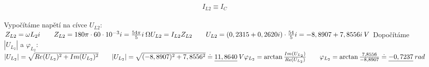 \huge{\[I_{L2} \equiv I_C\]} \\
\Large{Vypočítáme napětí na cívce \(U_{L2}\):}\\ 
\begin{math}
\newline
    Z_{L2} = \omega L_2i\quad\quad Z_{L2} = 180\pi\cdot 60 \cdot 10^{-3}i=\frac{54\pi}{5}i\:\Omega\\ \\
    U_{L2} = I_{L2}Z_{L2}\quad\quad U_{L2}= (0,2315+0,2620i)\cdot\frac{54}{5}i=-8,8907+7,8556i\:V\\ \\
\end{math}
\Large{Dopočítáme \(|U_{L_2}|\) a \(\varphi_{L_2}\):}\\
\begin{math}
\newline
    |U_{L_2}|= \sqrt{Re(U_{L_2})^2+Im(U_{L_2})^2}\quad\quad|U_{L_2}|=\sqrt{(-8,8907)^2+7,8556^2}\doteq\underline{11,8640}\:V\\\\
    \varphi_{L_2}=\arctan{\frac{Im(U_{L_2})}{Re(U_{L_2})}}\quad\quad\varphi_{L_2}=\arctan{\frac{7,8556}{-8,8907}}\doteq\underline{-0,7237}\:rad\\
\end{math}